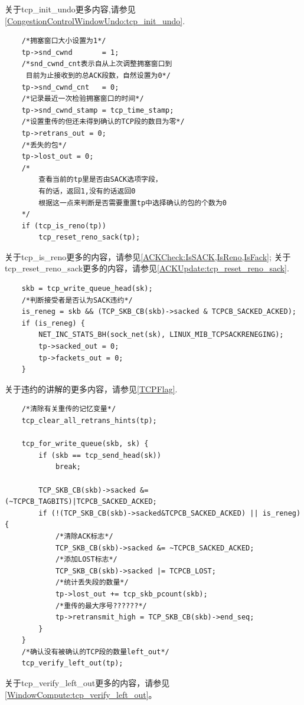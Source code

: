 	关于tcp\_init\_undo更多内容,请参见\ref{CongestionControlWindowUndo:tcp_init_undo}.

\begin{verbatim}
	/*拥塞窗口大小设置为1*/
	tp->snd_cwnd	   = 1;
	/*snd_cwnd_cnt表示自从上次调整拥塞窗口到
	 目前为止接收到的总ACK段数，自然设置为0*/
	tp->snd_cwnd_cnt   = 0;
	/*记录最近一次检验拥塞窗口的时间*/
	tp->snd_cwnd_stamp = tcp_time_stamp;
	/*设置重传的但还未得到确认的TCP段的数目为零*/
	tp->retrans_out = 0;
	/*丢失的包*/
	tp->lost_out = 0;
	/*
		查看当前的tp里是否由SACK选项字段，
		有的话，返回1,没有的话返回0
		根据这一点来判断是否需要重置tp中选择确认的包的个数为0
	*/
	if (tcp_is_reno(tp))
		tcp_reset_reno_sack(tp);
\end{verbatim}

	关于tcp\_is\_reno更多的内容，请参见\ref{ACKCheck:IsSACK,IsReno,IsFack};
	关于tcp\_reset\_reno\_sack更多的内容，请参见\ref{ACKUpdate:tcp_reset_reno_sack}.

\begin{verbatim}
	skb = tcp_write_queue_head(sk);
	/*判断接受者是否认为SACK违约*/
	is_reneg = skb && (TCP_SKB_CB(skb)->sacked & TCPCB_SACKED_ACKED);
	if (is_reneg) {
		NET_INC_STATS_BH(sock_net(sk), LINUX_MIB_TCPSACKRENEGING);
		tp->sacked_out = 0;
		tp->fackets_out = 0;
	}
\end{verbatim}

	关于违约的讲解的更多内容，请参见\ref{TCPFlag}.
\begin{verbatim}
	/*清除有关重传的记忆变量*/
	tcp_clear_all_retrans_hints(tp);

	tcp_for_write_queue(skb, sk) {
		if (skb == tcp_send_head(sk))
			break;

		TCP_SKB_CB(skb)->sacked &= (~TCPCB_TAGBITS)|TCPCB_SACKED_ACKED;
		if (!(TCP_SKB_CB(skb)->sacked&TCPCB_SACKED_ACKED) || is_reneg) {
			/*清除ACK标志*/
			TCP_SKB_CB(skb)->sacked &= ~TCPCB_SACKED_ACKED;
			/*添加LOST标志*/			
			TCP_SKB_CB(skb)->sacked |= TCPCB_LOST;
			/*统计丢失段的数量*/			
			tp->lost_out += tcp_skb_pcount(skb);
			/*重传的最大序号??????*/
			tp->retransmit_high = TCP_SKB_CB(skb)->end_seq;
		}
	}
	/*确认没有被确认的TCP段的数量left_out*/
	tcp_verify_left_out(tp);
\end{verbatim}

	关于tcp\_verify\_left\_out更多的内容，请参见\ref{WindowCompute:tcp_verify_left_out}。
	
